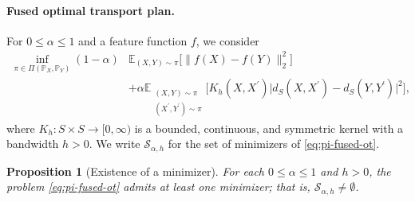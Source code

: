 \documentclass{article}
\newtheorem{proposition}{Proposition}
\begin{document}
\paragraph{Fused optimal transport plan.}
For $0\le \alpha\le 1$ and a feature function $f$, we consider
\begin{align}
	\label{eq:pi-fused-ot}
	\inf_{\pi\in\Pi(\mathbb{P}_X,\mathbb{P}_Y)} 
	(1-\alpha)&\mathbb{E}_{(X,Y)\sim\pi}\big[\|f(X)-f(Y)\|_2^2\big] \nonumber\\
	&+ \alpha\mathbb{E}_{\substack{(X,Y)\sim\pi\\(X^\prime,Y^\prime)\sim\pi}}
	\Big[K_h(X,X^\prime) \big|d_S(X,X^\prime)-d_S(Y,Y^\prime)\big|^2\Big],
\end{align}
where $K_h:S\times S\to[0,\infty)$ is a bounded, continuous, and symmetric kernel with a bandwidth $h > 0$. We write $\mathcal{S}_{\alpha,h}$ for the set of minimizers of \eqref{eq:pi-fused-ot}.

\begin{proposition}[Existence of a minimizer]
	\label{prop:existence}
	For each $0\le \alpha\le 1$ and $h > 0$, the problem \eqref{eq:pi-fused-ot} admits at least one minimizer; that is, $\mathcal{S}_{\alpha,h}\neq\emptyset$.
\end{proposition}


\end{document}
